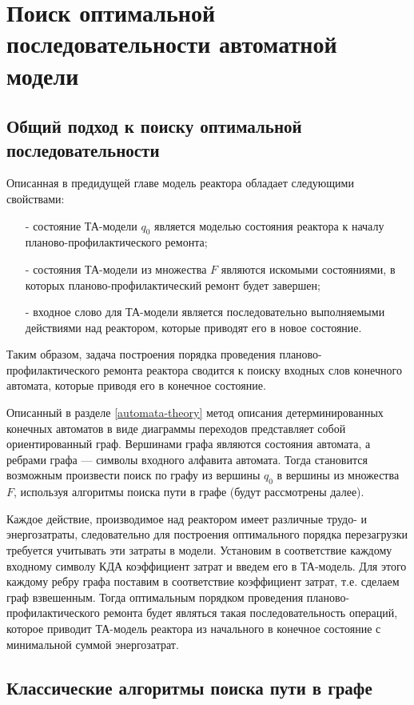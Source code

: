 \chapter{Поиск оптимальной последовательности автоматной модели}

\section{Общий подход к поиску оптимальной последовательности}

Описанная в предидущей главе модель реактора обладает следующими свойствами:
\begin{itemize}
 \item [-] состояние ТА-модели $q_0$ является моделью состояния реактора к началу планово-профилактического ремонта;
 \item [-] состояния ТА-модели из множества $F$ являются искомыми состояниями, в которых планово-профилактический ремонт будет завершен;
 \item [-] входное слово для ТА-модели является последовательно выполняемыми действиями над реактором, которые приводят его в новое состояние.
\end{itemize}
Таким образом, задача построения порядка проведения планово-профилактического ремонта реактора сводится к поиску входных слов конечного автомата, которые приводя его в конечное состояние.

Описанный в разделе \ref{automata-theory} метод описания детерминированных конечных автоматов в виде диаграммы переходов представляет собой ориентированный граф.
Вершинами графа являются состояния автомата, а ребрами графа --- символы входного алфавита автомата. 
Тогда становится возможным произвести поиск по графу из вершины $q_0$ в вершины из множества $F$, используя алгоритмы поиска пути в графе (будут рассмотрены далее).

Каждое действие, производимое над реактором имеет различные трудо- и энергозатраты, следовательно для построения оптимального порядка перезагрузки требуется учитывать эти затраты в модели.
Установим в соответствие каждому входному символу КДА коэффициент затрат и введем его в ТА-модель.
Для этого каждому ребру графа поставим в соответствие коэффициент затрат, т.е. сделаем граф взвешенным.
Тогда оптимальным порядком проведения планово-профилактического ремонта будет являться такая последовательность операций, которое приводит ТА-модель реактора из начального в конечное состояние с минимальной суммой энергозатрат.

\section{Классические алгоритмы поиска пути в графе}

